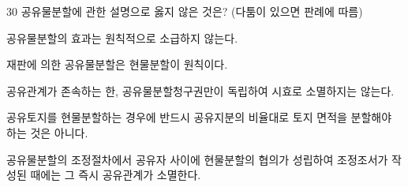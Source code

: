 \begin{question}{30}
공유물분할에 관한 설명으로 옳지 않은 것은? (다툼이 있으면 판례에 따름)
\begin{choices}
  \item 공유물분할의 효과는 원칙적으로 소급하지 않는다.
  \item 재판에 의한 공유물분할은 현물분할이 원칙이다.
  \item 공유관계가 존속하는 한, 공유물분할청구권만이 독립하여 시효로 소멸하지는 않는다.
  \item 공유토지를 현물분할하는 경우에 반드시 공유지분의 비율대로 토지 면적을 분할해야 하는 것은 아니다.
  \item 공유물분할의 조정절차에서 공유자 사이에 현물분할의 협의가 성립하여 조정조서가 작성된 때에는 그 즉시 공유관계가 소멸한다.
\end{choices}
\end{question}
